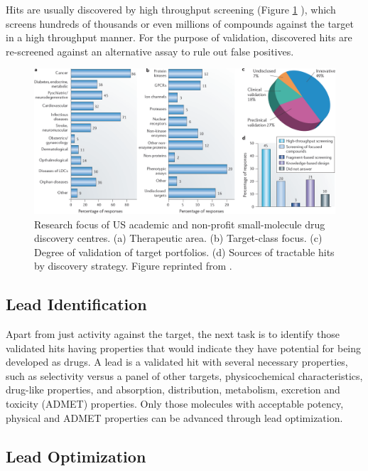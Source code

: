Hits are usually discovered by high throughput screening \citep{795,504,736} (Figure \ref{fig:USAcademicDrugDiscoveryResearchFocus} \citep{721}), which screens hundreds of thousands or even millions of compounds against the target in a high throughput manner. For the purpose of validation, discovered hits are re-screened against an alternative assay to rule out false positives.

\begin{figure}
\centering
\includegraphics[width=\textwidth]{Background/USAcademicDrugDiscoveryResearchFocus.png}
\caption{Research focus of US academic and non-profit small-molecule drug discovery centres. (a) Therapeutic area. (b) Target-class focus. (c) Degree of validation of target portfolios. (d) Sources of tractable hits by discovery strategy. Figure reprinted from \citep{721}.}
\label{fig:USAcademicDrugDiscoveryResearchFocus}
\end{figure}

\subsection{Lead Identification}

Apart from just activity against the target, the next task is to identify those validated hits having properties that would indicate they have potential for being developed as drugs. A lead is a validated hit with several necessary properties, such as selectivity versus a panel of other targets, physicochemical characteristics, drug-like properties, and absorption, distribution, metabolism, excretion and toxicity (ADMET) properties. Only those molecules with acceptable potency, physical and ADMET properties can be advanced through lead optimization.

\subsection{Lead Optimization}

